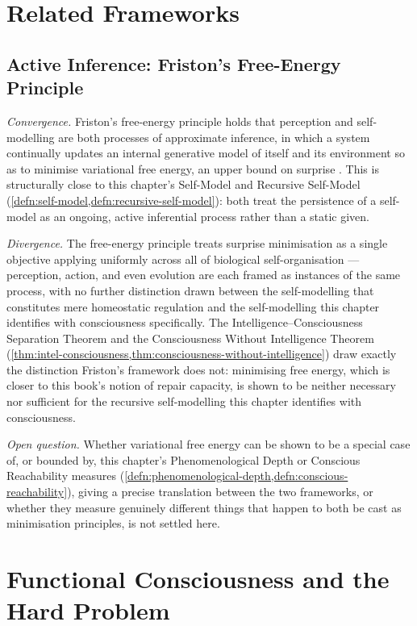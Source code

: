 \documentclass[12pt,twoside,openright]{book}
\begin{document}
\section{Related Frameworks}
\label{sec:ch21-related-frameworks}

\subsection*{Active Inference: Friston's Free-Energy Principle}

\emph{Convergence.} Friston's free-energy principle holds that
perception and self-modelling are both processes of approximate
inference, in which a system continually updates an internal
generative model of itself and its environment so as to minimise
variational free energy, an upper bound on surprise
\parencite{friston2010}. This is structurally close to this
chapter's Self-Model and Recursive Self-Model
(\cref{defn:self-model,defn:recursive-self-model}): both treat
the persistence of a self-model as an ongoing, active inferential
process rather than a static given.

\emph{Divergence.} The free-energy principle treats surprise
minimisation as a single objective applying uniformly across all
of biological self-organisation --- perception, action, and even
evolution are each framed as instances of the same process, with
no further distinction drawn between the self-modelling that
constitutes mere homeostatic regulation and the self-modelling
this chapter identifies with consciousness specifically. The
Intelligence--Consciousness Separation Theorem and the
Consciousness Without Intelligence Theorem
(\cref{thm:intel-consciousness,thm:consciousness-without-intelligence})
draw exactly the distinction Friston's framework does not:
minimising free energy, which is closer to this book's notion of
repair capacity, is shown to be neither necessary nor sufficient
for the recursive self-modelling this chapter identifies with
consciousness.

\emph{Open question.} Whether variational free energy can be
shown to be a special case of, or bounded by, this chapter's
Phenomenological Depth or Conscious Reachability measures
(\cref{defn:phenomenological-depth,defn:conscious-reachability}),
giving a precise translation between the two frameworks, or
whether they measure genuinely different things that happen to
both be cast as minimisation principles, is not settled here.

\section{Functional Consciousness and the Hard Problem}
\label{sec:ch21-hard-problem}
\end{document}
